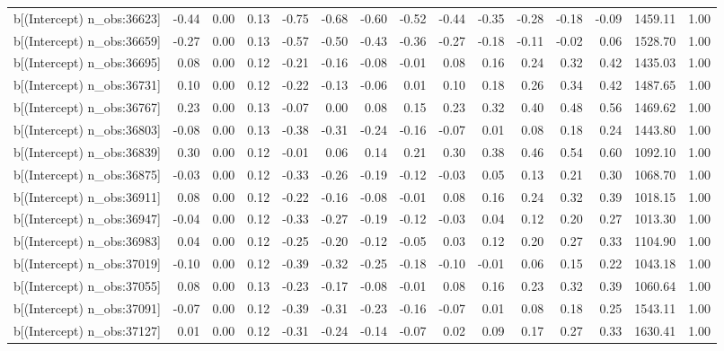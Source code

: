 \begin{table}[ht]
\begin{tabular}{rrrrrrrrrrrrrrr}
  b[(Intercept) n\_obs:36623] & -0.44 & 0.00 & 0.13 & -0.75 & -0.68 & -0.60 & -0.52 & -0.44 & -0.35 & -0.28 & -0.18 & -0.09 & 1459.11 & 1.00 \\ 
  b[(Intercept) n\_obs:36659] & -0.27 & 0.00 & 0.13 & -0.57 & -0.50 & -0.43 & -0.36 & -0.27 & -0.18 & -0.11 & -0.02 & 0.06 & 1528.70 & 1.00 \\ 
  b[(Intercept) n\_obs:36695] & 0.08 & 0.00 & 0.12 & -0.21 & -0.16 & -0.08 & -0.01 & 0.08 & 0.16 & 0.24 & 0.32 & 0.42 & 1435.03 & 1.00 \\ 
  b[(Intercept) n\_obs:36731] & 0.10 & 0.00 & 0.12 & -0.22 & -0.13 & -0.06 & 0.01 & 0.10 & 0.18 & 0.26 & 0.34 & 0.42 & 1487.65 & 1.00 \\ 
  b[(Intercept) n\_obs:36767] & 0.23 & 0.00 & 0.13 & -0.07 & 0.00 & 0.08 & 0.15 & 0.23 & 0.32 & 0.40 & 0.48 & 0.56 & 1469.62 & 1.00 \\ 
  b[(Intercept) n\_obs:36803] & -0.08 & 0.00 & 0.13 & -0.38 & -0.31 & -0.24 & -0.16 & -0.07 & 0.01 & 0.08 & 0.18 & 0.24 & 1443.80 & 1.00 \\ 
  b[(Intercept) n\_obs:36839] & 0.30 & 0.00 & 0.12 & -0.01 & 0.06 & 0.14 & 0.21 & 0.30 & 0.38 & 0.46 & 0.54 & 0.60 & 1092.10 & 1.00 \\ 
  b[(Intercept) n\_obs:36875] & -0.03 & 0.00 & 0.12 & -0.33 & -0.26 & -0.19 & -0.12 & -0.03 & 0.05 & 0.13 & 0.21 & 0.30 & 1068.70 & 1.00 \\ 
  b[(Intercept) n\_obs:36911] & 0.08 & 0.00 & 0.12 & -0.22 & -0.16 & -0.08 & -0.01 & 0.08 & 0.16 & 0.24 & 0.32 & 0.39 & 1018.15 & 1.00 \\ 
  b[(Intercept) n\_obs:36947] & -0.04 & 0.00 & 0.12 & -0.33 & -0.27 & -0.19 & -0.12 & -0.03 & 0.04 & 0.12 & 0.20 & 0.27 & 1013.30 & 1.00 \\ 
  b[(Intercept) n\_obs:36983] & 0.04 & 0.00 & 0.12 & -0.25 & -0.20 & -0.12 & -0.05 & 0.03 & 0.12 & 0.20 & 0.27 & 0.33 & 1104.90 & 1.00 \\ 
  b[(Intercept) n\_obs:37019] & -0.10 & 0.00 & 0.12 & -0.39 & -0.32 & -0.25 & -0.18 & -0.10 & -0.01 & 0.06 & 0.15 & 0.22 & 1043.18 & 1.00 \\ 
  b[(Intercept) n\_obs:37055] & 0.08 & 0.00 & 0.13 & -0.23 & -0.17 & -0.08 & -0.01 & 0.08 & 0.16 & 0.23 & 0.32 & 0.39 & 1060.64 & 1.00 \\ 
  b[(Intercept) n\_obs:37091] & -0.07 & 0.00 & 0.12 & -0.39 & -0.31 & -0.23 & -0.16 & -0.07 & 0.01 & 0.08 & 0.18 & 0.25 & 1543.11 & 1.00 \\ 
  b[(Intercept) n\_obs:37127] & 0.01 & 0.00 & 0.12 & -0.31 & -0.24 & -0.14 & -0.07 & 0.02 & 0.09 & 0.17 & 0.27 & 0.33 & 1630.41 & 1.00 \\ 

\end{tabular}
\end{table}
